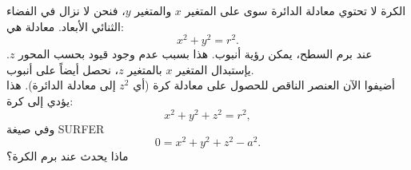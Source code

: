 \begin{surferPage}[كرة]{الكرة}
لا تحتوي معادلة الدائرة سوى على المتغير $x$ والمتغير $y$، فنحن لا نزال في الفضاء الثنائي الأبعاد.
معادلة هي:
\[x^2+y^2=r^2.\]
عند برم السطح، يمكن رؤية أنبوب. هذا بسبب عدم وجود قيود بحسب المحور $z$. يإستبدال المتغير $x$ بالمتغير $z$، نحصل أيضاً على أنبوب.\\
أضيفوا الآن العنصر الناقص للحصول على معادلة كرة (أي $z^2$ إلى معادلة الدائرة). هذا يؤدي إلى كرة:
\[x^2+y^2+z^2=r^2,\]
وفي صيغة \textenglish{SURFER}
\[0=x^2+y^2+z^2-a^2.\]
ماذا يحدث عند برم الكرة؟
\end{surferPage}
